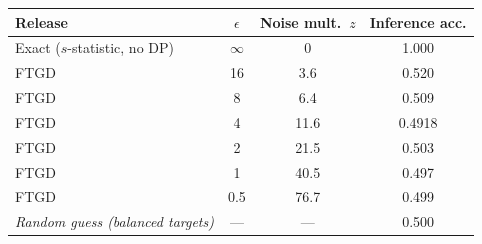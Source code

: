 \begin{tabular}{lccc}
\toprule
Release & $\epsilon$ & Noise mult.\ $z$ & Inference acc. \\
\midrule
Exact ($s$-statistic, no DP) & $\infty$ & 0 & 1.000 \\
FTGD & 16 & 3.6 & 0.520 \\
FTGD & 8 & 6.4 & 0.509 \\
FTGD & 4 & 11.6 & 0.4918 \\
FTGD & 2 & 21.5 & 0.503 \\
FTGD & 1 & 40.5 & 0.497 \\
FTGD & 0.5 & 76.7 & 0.499 \\
\midrule
\emph{Random guess (balanced targets)} & --- & --- & 0.500 \\
\bottomrule
\end{tabular}